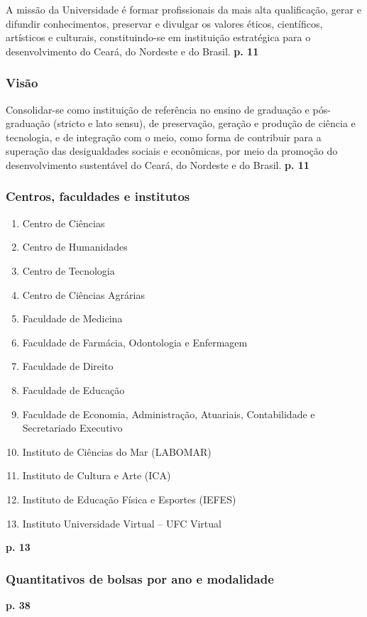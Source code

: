 \documentclass{article}
\begin{document}
A missão da Universidade é formar profissionais da mais alta qualificação, gerar e difundir conhecimentos, preservar e divulgar os valores éticos, científicos, artísticos e culturais, constituindo-se em instituição estratégica para o desenvolvimento do Ceará, do Nordeste e do Brasil.
\textbf{p. 11}

\subsubsection*{Visão}

Consolidar-se como instituição de referência no ensino de graduação e pós-graduação (stricto e lato sensu), de preservação, geração e produção de ciência e tecnologia, e de integração com o meio, como forma de contribuir para a superação das desigualdades sociais e econômicas, por meio da promoção do desenvolvimento sustentável do Ceará, do Nordeste e do Brasil.
\textbf{p. 11}

\subsubsection*{Centros, faculdades e institutos}

\begin{enumerate}
\item 
Centro de Ciências
\item 
Centro de Humanidades
\item 
Centro de Tecnologia
\item 
Centro de Ciências Agrárias
\item 
Faculdade de Medicina
\item 
Faculdade de Farmácia, Odontologia e Enfermagem
\item 
Faculdade de Direito
\item 
Faculdade de Educação
\item 
Faculdade de Economia, Administração, Atuariais, Contabilidade e Secretariado Executivo
\item 
Instituto de Ciências do Mar (LABOMAR)
\item 
Instituto de Cultura e Arte (ICA)
\item 
Instituto de Educação Física e Esportes (IEFES)
\item 
Instituto Universidade Virtual – UFC Virtual
\end{enumerate}
\textbf{p. 13}

\subsubsection*{Quantitativos de bolsas por ano e modalidade}
\textbf{p. 38}
\end{document}
